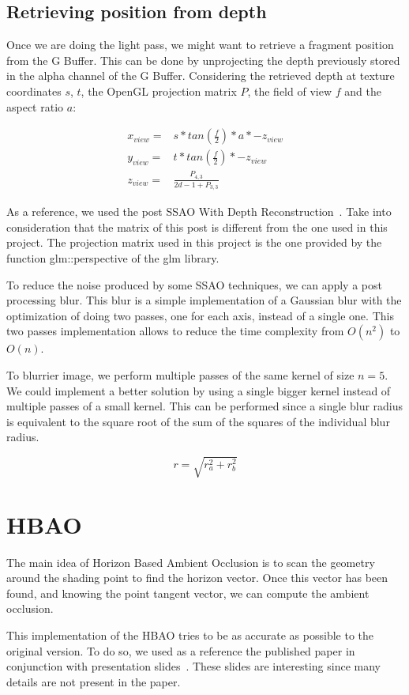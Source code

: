 \documentclass{article}
\begin{document}
\subsection*{Retrieving position from depth}
Once we are doing the light pass, we might want to retrieve a fragment position from the G Buffer. This can be done by unprojecting the depth previously stored in the alpha channel of the G Buffer. Considering the retrieved depth  at texture coordinates $s$, $t$, the OpenGL projection matrix $P$, the field of view $f$  and the aspect ratio $a$:

\begin{align*}
x_{view} = & s * tan(\frac{f}{2}) * a * -z_{view} \\
y_{view} = & t * tan(\frac{f}{2}) * -z_{view} \\
z_{view} = & \frac{P_{4,3}}{2d -1 + P_{3,3}}
\end{align*}

As a reference, we used the post SSAO With Depth Reconstruction~\cite{depth}. Take into consideration that the matrix of this post is different from the one used in this project. The projection matrix used in this project is the one provided by the function glm::perspective of the glm library.


To reduce the noise produced by some SSAO techniques, we can apply a post processing blur. This blur is a simple implementation of a Gaussian blur with the optimization of doing two passes, one for each axis, instead of a single one. This two passes implementation allows to reduce the time complexity from $O(n^2)$ to $O(n)$.

To blurrier image, we perform multiple passes of the same kernel of size $n=5$. We could implement a better solution by using a single bigger kernel instead of multiple passes of a small kernel. This can be performed since a single blur radius is equivalent to the square root of the sum of the squares of the individual blur radius.

$$
r = \sqrt{r^2_a + r^2_b}
$$

\section*{HBAO}
The main idea of Horizon Based Ambient Occlusion is to scan the geometry around the shading point to find the horizon vector. Once this vector has been found, and knowing the point tangent vector, we can compute the ambient occlusion.

This implementation of the HBAO tries to be as accurate as possible to the original version. To do so, we used as a reference the published paper in conjunction with presentation slides~\cite{hbao}. These slides are interesting since many details are not present in the paper.
\end{document}
